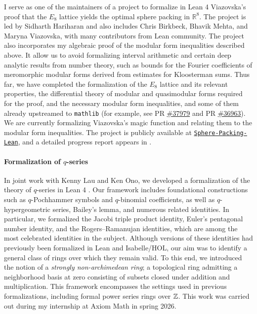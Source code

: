 \documentclass[letterpaper, 10pt]{article}
\begin{document}
I serve as one of the maintainers of a project to formalize in Lean 4 Viazovska's proof that the $E_8$ lattice yields the optimal sphere packing in $\mathbb{R}^8$. The project is led by Sidharth Hariharan and also includes Chris Birkbeck, Bhavik Mehta, and Maryna Viazovska, with many contributors from Lean community.
The project also incorporates my algebraic proof of the modular form inequalities described above.
It allow us to avoid formalizing interval arithmetic and certain deep analytic results from number theory, such as bounds for the Fourier coefficients of meromorphic modular forms derived from estimates for Kloosterman sums.
Thus far, we have completed the formalization of the $E_8$ lattice and its relevant properties, the differential theory of modular and quasimodular forms required for the proof, and the necessary modular form inequalities, and some of them already upstreamed to \texttt{mathlib} (for example, see PR \href{https://github.com/leanprover-community/mathlib4/pull/37979}{\#37979} and PR \href{https://github.com/leanprover-community/mathlib4/pull/36963}{\#36963}). We are currently formalizing Viazovska's magic function and relating them to the modular form inequalities.
The project is publicly available at \href{https://github.com/thefundamentaltheor3m/Sphere-Packing-Lean}{\texttt{Sphere-Packing-Lean}}, and a detailed progress report appears in \cite{hariharan2026progress}.


\paragraph{Formalization of $q$-series}

In joint work with Kenny Lau and Ken Ono, we developed a formalization of the theory of $q$-series in Lean 4 \cite{lau2026formalized}. Our framework includes foundational constructions such as $q$-Pochhammer symbols and $q$-binomial coefficients, as well as $q$-hypergeometric series, Bailey's lemma, and numerous related identities. In particular, we formalized the Jacobi triple product identity, Euler's pentagonal number identity, and the Rogers--Ramanujan identities, which are among the most celebrated identities in the subject. Although versions of these identities had previously been formalized in Lean and Isabelle/HOL, our aim was to identify a general class of rings over which they remain valid. To this end, we introduced the notion of a \emph{strongly non-archimedean ring}; a topological ring admitting a neighborhood basis at zero consisting of subsets closed under addition and multiplication. This framework encompasses the settings used in previous formalizations, including formal power series rings over $\mathbb{Z}$. This work was carried out during my internship at Axiom Math in spring 2026.
\end{document}
